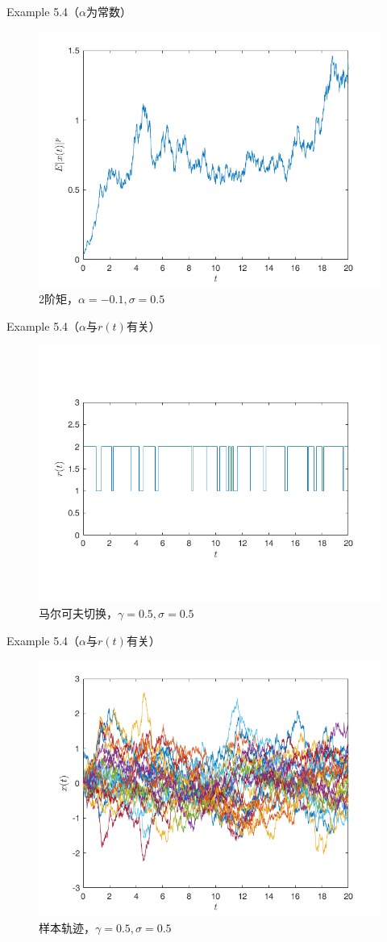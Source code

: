 \documentclass[10pt,aspectratio=43]{beamer}
\begin{document}
\begin{frame}{Example 5.4（$ \alpha $为常数）}
\begin{figure}
\centering
\includegraphics[width=0.7\linewidth]{../figures/4}
\caption{2阶矩，$ \alpha=-0.1,\sigma=0.5 $}
\end{figure}
\end{frame}

\begin{frame}{Example 5.4（$ \alpha $与$ r(t) $有关）
}
\begin{figure}
\centering
\includegraphics[width=0.7\linewidth]{../figures/5}
\caption{马尔可夫切换，$ \gamma=0.5,\sigma=0.5 $}
\end{figure}
\end{frame}

\begin{frame}{Example 5.4（$ \alpha $与$ r(t) $有关）
}
\begin{figure}
\centering
\includegraphics[width=0.7\linewidth]{../figures/6}
\caption{样本轨迹，$ \gamma=0.5,\sigma=0.5 $}
\end{figure}
\end{frame}
\end{document}
